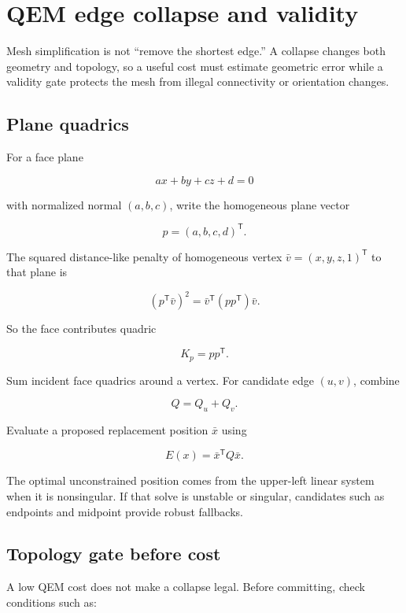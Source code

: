 \hypertarget{appendix-89db9fe1bc8a}{}
\section{QEM edge collapse and validity}\label{appendix-89db9fe1bc8a-qem-edge-collapse-and-validity}

Mesh simplification is not ``remove the shortest edge.'' A collapse changes both geometry and topology, so a useful cost must estimate geometric error while a validity gate protects the mesh from illegal connectivity or orientation changes.

\subsection{Plane quadrics}\label{appendix-89db9fe1bc8a-plane-quadrics}

For a face plane

\[
ax+by+cz+d=0
\]

with normalized normal \((a,b,c)\), write the homogeneous plane vector

\[
p=(a,b,c,d)^{\mathsf T}.
\]

The squared distance-like penalty of homogeneous vertex \(\bar v=(x,y,z,1)^{\mathsf T}\) to that plane is

\[
(p^{\mathsf T}\bar v)^2
=
\bar v^{\mathsf T}(pp^{\mathsf T})\bar v.
\]

So the face contributes quadric

\[
K_p=pp^{\mathsf T}.
\]

Sum incident face quadrics around a vertex. For candidate edge \((u,v)\), combine

\[
Q=Q_u+Q_v.
\]

Evaluate a proposed replacement position \(\bar x\) using

\[
E(x)=\bar x^{\mathsf T}Q\bar x.
\]

The optimal unconstrained position comes from the upper-left linear system when it is nonsingular. If that solve is unstable or singular, candidates such as endpoints and midpoint provide robust fallbacks.

\subsection{Topology gate before cost}\label{appendix-89db9fe1bc8a-topology-gate-before-cost}

A low QEM cost does not make a collapse legal. Before committing, check conditions such as:

